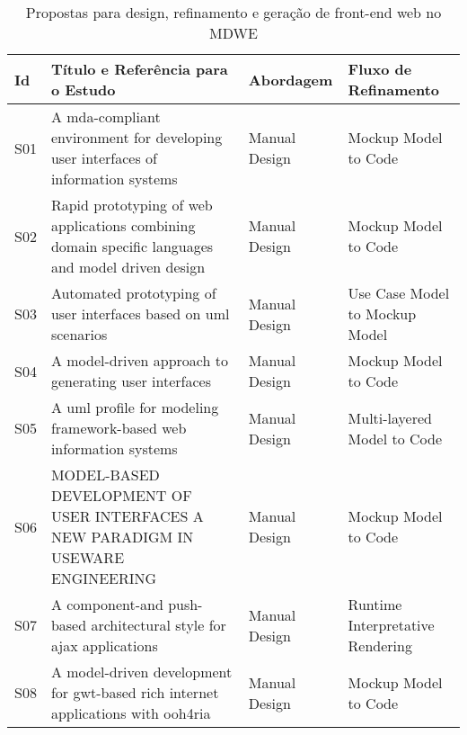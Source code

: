 
\begin{table*}[ht!]
\small
  \caption{Propostas para design, refinamento e geração de front-end web no MDWE} %
  
		\begin{tabular}{ | p{0.3cm} | p{9.5cm} | p{2.2cm} |  p{4.2cm} |}%
    \hline

     \textbf{Id}
    & \textbf{Título e Referência para o Estudo}
    & \textbf{Abordagem}
    & \textbf{Fluxo de Refinamento}
		\\ \hline

S01 &  A mda-compliant environment for developing user interfaces of information systems~\cite{Vanderdonckt05} & Manual Design & Mockup Model to Code \\ \hline

S02 &  Rapid prototyping of web applications combining domain specific languages and model driven design~\cite{Nunes06} & Manual Design & Mockup Model to Code \\ \hline

S03 &  Automated prototyping of user interfaces based on uml scenarios~\cite{Elkoutbi06} & Manual Design & Use Case Model to Mockup Model \\ \hline

S04 &  A model-driven approach to generating user interfaces~\cite{Kavaldjian07} & Manual Design  & Mockup Model to Code \\ \hline

S05 & A uml profile for modeling framework-based web information systems ~\cite{Souza07} & Manual Design  & Multi-layered Model to Code \\ \hline

S06 &  MODEL-BASED DEVELOPMENT OF USER INTERFACES A NEW PARADIGM IN USEWARE ENGINEERING~\cite{ZUEHLKE200731} & Manual Design  & Mockup Model to Code \\ \hline		

S07 &  A component-and push-based architectural style for ajax applications~\cite{mesbah2008component} & Manual Design  & Runtime Interpretative Rendering \\ \hline

S08 &  A model-driven development for gwt-based rich internet applications with ooh4ria~\cite{Melia08} & Manual Design & Mockup Model to Code \\ \hline


\end{tabular}
\end{table*}
